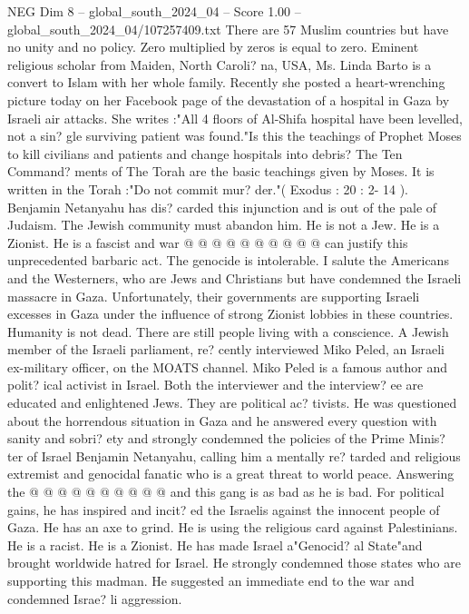 \begin{textsample}{NEG Dim 8 – global\_south\_2024\_04 – Score 1.00 – global\_south\_2024\_04/107257409.txt}  \label{ex:f8_neg_269}
There are 57 Muslim countries but have no unity and no policy.
Zero multiplied by zeros is equal to zero.
Eminent religious scholar from Maiden, North Caroli? na, USA, Ms.
Linda Barto is a convert to Islam with her whole family.
Recently she posted a heart-wrenching picture today on her Facebook page of the devastation of a hospital in Gaza by Israeli air attacks.
She writes :"All 4 floors of Al-Shifa hospital have been levelled, not a sin? gle surviving patient was found."Is this the teachings of Prophet Moses to kill civilians and patients and change hospitals into debris?
The Ten Command? ments of The Torah are the basic teachings given by Moses.
It is written in the Torah :"Do not commit mur? der."( Exodus : 20 : 2- 14 ).
Benjamin Netanyahu has dis? carded this injunction and is out of the pale of Judaism.
The Jewish community must abandon him.
He is not a Jew.
He is a Zionist.
He is a fascist and war @ @ @ @ @ @ @ @ @ @ can justify this unprecedented barbaric act.
The genocide is intolerable.
I salute the Americans and the Westerners, who are Jews and Christians but have condemned the Israeli massacre in Gaza.
Unfortunately, their governments are supporting Israeli excesses in Gaza under the influence of strong Zionist lobbies in these countries.
Humanity is not dead.
There are still people living with a conscience.
A Jewish member of the Israeli parliament, re? cently interviewed Miko Peled, an Israeli ex-military officer, on the MOATS channel.
Miko Peled is a famous author and polit? ical activist in Israel.
Both the interviewer and the interview? ee are educated and enlightened Jews.
They are political ac? tivists.
He was questioned about the horrendous situation in Gaza and he answered every question with sanity and sobri? ety and strongly condemned the policies of the Prime Minis? ter of Israel Benjamin Netanyahu, calling him a mentally re? tarded and religious extremist and genocidal fanatic who is a great threat to world peace.
Answering the @ @ @ @ @ @ @ @ @ @ and this gang is as bad as he is bad.
For political gains, he has inspired and incit? ed the Israelis against the innocent people of Gaza.
He has an axe to grind.
He is using the religious card against Palestinians.
He is a racist.
He is a Zionist.
He has made Israel a"Genocid? al State"and brought worldwide hatred for Israel.
He strongly condemned those states who are supporting this madman.
He suggested an immediate end to the war and condemned Israe? li aggression.

\end{textsample}
